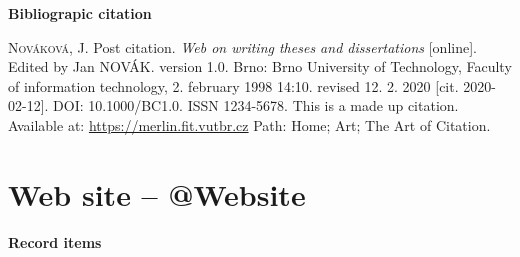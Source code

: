\bigskip

\noindent \textbf{Bibliograpic citation}

\medskip

\noindent \textsc{Nováková}, J. Post citation. \textit{Web on writing theses and dissertations} [online]. Edited by Jan NOVÁK. version 1.0. Brno: Brno University of Technology, Faculty of information technology, 2. february 1998 14:10. revised 12. 2. 2020 [cit. 2020-02-12]. DOI: 10.1000/BC1.0. ISSN 1234-5678. This is a made up citation. Available at: \url{https://merlin.fit.vutbr.cz} Path: Home; Art; The Art of Citation.
\newpage
\section*{Web site -- @Website}
\label{pr-website}
\noindent \textbf{Record items}

\medskip

